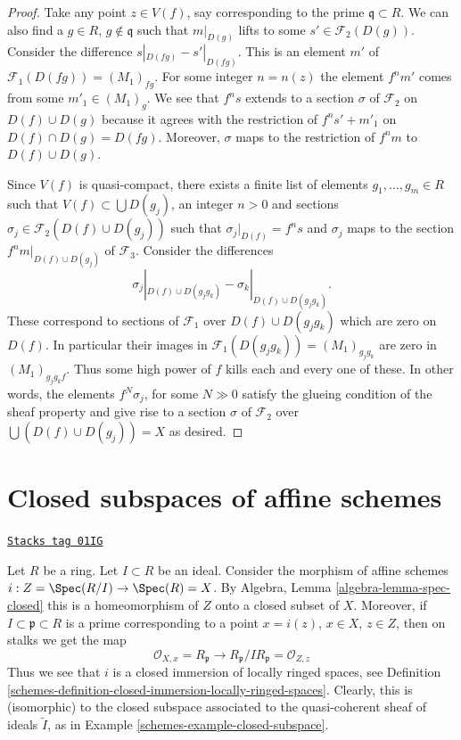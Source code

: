 \begin{proof}
\medskip\noindent
Take any point $z \in V(f)$, say corresponding to the
prime $\mathfrak q \subset R$. We can also find a $g \in R$,
$g \not \in \mathfrak q$ such that $m|_{D(g)}$ lifts
to some $s' \in \mathcal{F}_2(D(g))$.
Consider the difference $s|_{D(fg)} - s'|_{D(fg)}$.
This is an element $m'$ of $\mathcal{F}_1(D(fg)) = (M_1)_{fg}$.
For some integer $n = n(z)$ the element $f^n m'$ comes
from some $m'_1 \in (M_1)_g$. We see that
$f^n s$ extends to a section $\sigma$ of $\mathcal{F}_2$ on $D(f) \cup D(g)$
because it agrees with the restriction of
$f^n s' + m'_1$ on $D(f) \cap D(g) = D(fg)$.
Moreover, $\sigma$ maps to the restriction of $f^n m$
to $D(f) \cup D(g)$.

\medskip\noindent
Since $V(f)$ is quasi-compact, there exists a finite list
of elements $g_1, \ldots, g_m \in R$ such that
$V(f) \subset \bigcup D(g_j)$, an integer $n > 0$ and sections
$\sigma_j \in \mathcal{F}_2(D(f) \cup D(g_j))$ such that
$\sigma_j|_{D(f)} = f^n s$ and $\sigma_j$ maps to the section
$f^nm|_{D(f) \cup D(g_j)}$ of $\mathcal{F}_3$.
Consider the differences
$$
\sigma_j|_{D(f) \cup D(g_jg_k)}
-
\sigma_k|_{D(f) \cup D(g_jg_k)}.
$$
These correspond to sections of $\mathcal{F}_1$
over $D(f) \cup D(g_jg_k)$ which are zero
on $D(f)$. In particular their images in
$\mathcal{F}_1(D(g_jg_k)) = (M_1)_{g_jg_k}$
are zero in $(M_1)_{g_jg_kf}$.
Thus some high power of $f$ kills each and every one of these.
In other words, the elements $f^N \sigma_j$, for some $N \gg 0$
satisfy the glueing condition of the sheaf property and
give rise to a section $\sigma $ of $\mathcal{F}_2$
over $\bigcup (D(f) \cup D(g_j)) = X$ as desired.
\end{proof}

\section{Closed subspaces of affine schemes}
\label{schemes-section-closed-in-affine}
\begin{example}
\label{schemes-example-closed-immersion-affines}
\href{https://stacks.math.columbia.edu/tag/01IG}{\texttt{Stacks tag 01IG}}

Let $R$ be a ring.
Let $I \subset R$ be an ideal.
Consider the morphism of affine schemes
$i : Z = \Spec(R/I) \to \Spec(R) = X$.
By Algebra, Lemma \ref{algebra-lemma-spec-closed}
this is a homeomorphism of $Z$ onto a closed
subset of $X$. Moreover, if $I \subset \mathfrak p \subset R$
is a prime corresponding to a point $x = i(z)$, $x \in X$,
$z \in Z$, then on stalks we get the map
$$
\mathcal{O}_{X, x} = R_{\mathfrak p}
\longrightarrow
R_{\mathfrak p}/IR_{\mathfrak p} = \mathcal{O}_{Z, z}
$$
Thus we see that $i$ is a closed immersion of locally ringed spaces,
see Definition \ref{schemes-definition-closed-immersion-locally-ringed-spaces}.
Clearly, this is (isomorphic) to the closed subspace associated
to the quasi-coherent sheaf of ideals $\widetilde I$, as in
Example \ref{schemes-example-closed-subspace}.
\end{example}

